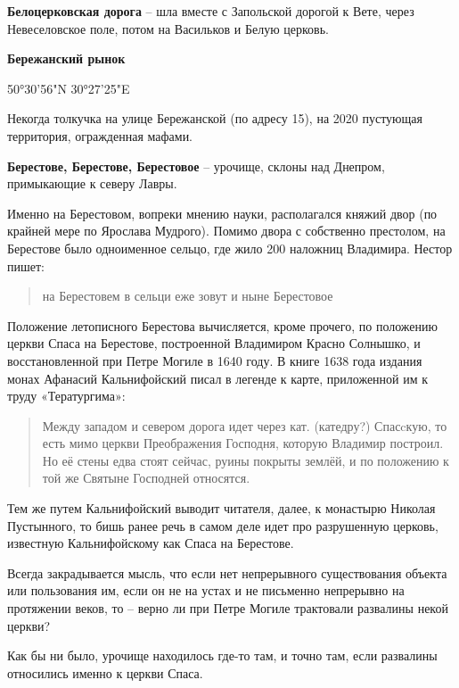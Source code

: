 \medskip


\textbf{Белоцерковская дорога} – шла вместе с Запольской дорогой к Вете, через Невеселовское поле, потом на Васильков и Белую церковь.\\

\medskip

\textbf{Бережанский рынок}

50°30'56"N 30°27'25"E

Некогда толкучка на улице Бережанской (по адресу 15), на 2020 пустующая территория, огражденная мафами.\\

\medskip


\textbf{Берестове, Берестове, Берестовое} – урочище, склоны над Днепром, примыкающие к северу Лавры. 

Именно на Берестовом, вопреки мнению науки, располагался княжий двор (по крайней мере по Ярослава Мудрого). Помимо двора с собственно престолом, на Берестове было одноименное сельцо, где жило 200 наложниц Владимира. Нестор пишет:

\begin{quotation}
\noindent на Берестовем в сельци еже зовут и ныне Берестовое
\end{quotation}

Положение летописного Берестова вычисляется, кроме прочего, по положению церкви Спаса на Берестове, построенной Владимиром Красно Солнышко, и восстановленной при Петре Могиле в 1640 году. В книге 1638 года издания монах Афанасий Кальнифойский писал в легенде к карте, приложенной им к труду «Тератургима»:

\begin{quotation}
Между западом и севером дорога идет через кат. (катедру?) Спасcкую, то есть мимо церкви Преображения Господня, которую Владимир построил. Но её стены едва стоят сейчас, руины покрыты землёй, и по положению к той же Святыне Господней относятся.
\end{quotation}

Тем же путем Кальнифойский выводит читателя, далее, к монастырю Николая Пустынного, то бишь ранее речь в самом деле идет про разрушенную церковь, известную Кальнифойскому как Спаса на Берестове.

Всегда закрадывается мысль, что если нет непрерывного существования объекта или пользования им, если он не на устах и не письменно непрерывно на протяжении веков, то – верно ли при Петре Могиле трактовали развалины некой церкви?

Как бы ни было, урочище находилось где-то там, и точно там, если развалины относились именно к церкви Спаса.

